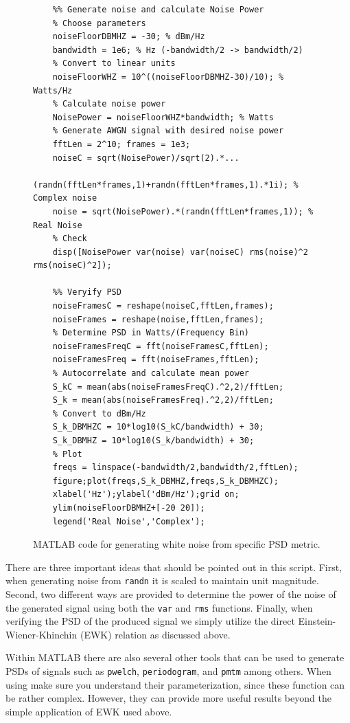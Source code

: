 \documentclass[letterpaper,12pt]{article}
\begin{document}
%
\begin{figure}[!htp]
    \centering
\begin{minipage}{0.9\linewidth}
\begin{lstlisting}
    %% Generate noise and calculate Noise Power
    % Choose parameters
    noiseFloorDBMHZ = -30; % dBm/Hz
    bandwidth = 1e6; % Hz (-bandwidth/2 -> bandwidth/2)
    % Convert to linear units
    noiseFloorWHZ = 10^((noiseFloorDBMHZ-30)/10); % Watts/Hz
    % Calculate noise power
    NoisePower = noiseFloorWHZ*bandwidth; % Watts
    % Generate AWGN signal with desired noise power
    fftLen = 2^10; frames = 1e3;
    noiseC = sqrt(NoisePower)/sqrt(2).*...
        (randn(fftLen*frames,1)+randn(fftLen*frames,1).*1i); % Complex noise
    noise = sqrt(NoisePower).*(randn(fftLen*frames,1)); % Real Noise
    % Check
    disp([NoisePower var(noise) var(noiseC) rms(noise)^2 rms(noiseC)^2]);

    %% Veryify PSD
    noiseFramesC = reshape(noiseC,fftLen,frames);
    noiseFrames = reshape(noise,fftLen,frames);
    % Determine PSD in Watts/(Frequency Bin)
    noiseFramesFreqC = fft(noiseFramesC,fftLen);
    noiseFramesFreq = fft(noiseFrames,fftLen);
    % Autocorrelate and calculate mean power
    S_kC = mean(abs(noiseFramesFreqC).^2,2)/fftLen;
    S_k = mean(abs(noiseFramesFreq).^2,2)/fftLen;
    % Convert to dBm/Hz
    S_k_DBMHZC = 10*log10(S_kC/bandwidth) + 30;
    S_k_DBMHZ = 10*log10(S_k/bandwidth) + 30;
    % Plot
    freqs = linspace(-bandwidth/2,bandwidth/2,fftLen);
    figure;plot(freqs,S_k_DBMHZ,freqs,S_k_DBMHZC);
    xlabel('Hz');ylabel('dBm/Hz');grid on;
    ylim(noiseFloorDBMHZ+[-20 20]);
    legend('Real Noise','Complex');

\end{lstlisting}
\end{minipage}
\caption{MATLAB code for generating white noise from specific PSD metric.}\label{fig:power_code}
\end{figure}
%
There are three important ideas that should be pointed out in this script.  First, when generating noise from \texttt{randn} it is scaled to maintain unit magnitude.  Second, two different ways are provided to determine the power of the noise of the generated signal using both the \texttt{var} and \texttt{rms} functions. Finally, when verifying the PSD of the produced signal we simply utilize the direct Einstein-Wiener-Khinchin (EWK) relation as discussed above.\par
%
Within MATLAB there are also several other tools that can be used to generate PSDs of signals such as \texttt{pwelch}, \texttt{periodogram}, and \texttt{pmtm} among others.  When using make sure you understand their parameterization, since these function can be rather complex. However, they can provide more useful results beyond the simple application of EWK used above.
\end{document}
